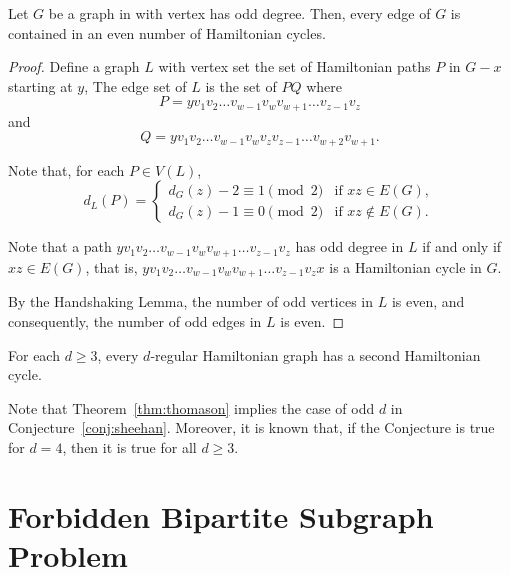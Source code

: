 \begin{theorem}[Thomason] \label{thm:thomason}
    Let \(G\) be a graph in with vertex has odd degree.
    Then, every edge of \(G\) is contained in an even number of Hamiltonian cycles.
\end{theorem}

\begin{proof}
    Define a graph \(L\) with vertex set the set of
    Hamiltonian paths \(P\) in \(G - x\) starting at \(y\),
    The edge set of \(L\) is the set of \(PQ\) where
    \begin{equation}
        P = y v_1 v_2 \ldots v_{w-1} v_w v_{w+1} \ldots v_{z-1} v_z
    \end{equation}
    and 
    \begin{equation}
        Q = y v_1 v_2 \ldots v_{w-1} v_w v_z v_{z-1} \ldots v_{w+2} v_{w+1}.
    \end{equation}

    Note that, for each \(P \in V(L)\),
    \begin{equation}
        d_L(P) =
        \begin{cases}
            d_G(z) - 2 \equiv 1 \pmod{2} & \text{if } xz \in E(G), \\
            d_G(z) - 1 \equiv 0 \pmod{2} & \text{if } xz \not\in E(G).
        \end{cases}
    \end{equation}

    Note that a path \(y v_1 v_2 \ldots v_{w-1} v_w v_{w+1} \ldots v_{z-1} v_z\) 
    has odd degree in \(L\) if and only if \(xz \in E(G)\), that is, \(y v_1 v_2 \ldots v_{w-1} v_w v_{w+1} \ldots v_{z-1} v_z x\) is a Hamiltonian cycle in \(G\).

    By the Handshaking Lemma,
    the number of odd vertices in \(L\) is even,
    and consequently, the number of odd edges in \(L\) is even.
\end{proof}

\begin{conjecture}[Sheehan] \label{conj:sheehan}
    For each \(d \geq 3\), every \(d\)-regular Hamiltonian graph has a second Hamiltonian cycle.
\end{conjecture}

Note that Theorem~\ref{thm:thomason} implies the case of odd \(d\) in Conjecture~\ref{conj:sheehan}.
Moreover, it is known that, if the Conjecture is true for \(d = 4\), then it is true for all \(d \geq 3\).

\section{Forbidden Bipartite Subgraph Problem}


